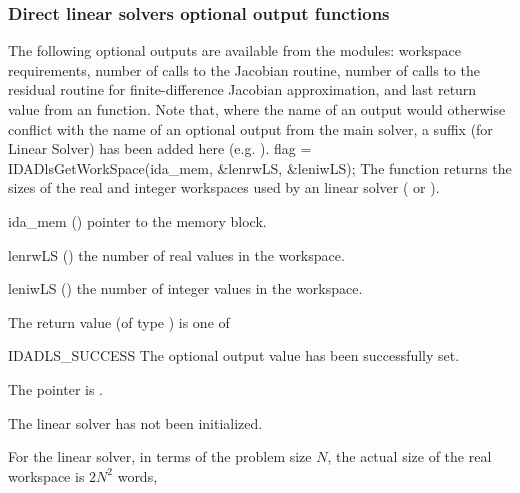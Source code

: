 {\subsubsection{Direct linear solvers optional output functions}\label{sss:optout_dls}
The following optional outputs are available from the {\idadls} modules:
workspace requirements, number of calls to the Jacobian routine, number of 
calls to the residual routine for finite-difference Jacobian approximation,
and last return value from an {\idadls} function.
Note that, where the name of an output would otherwise conflict with
the name of an optional output from the main solver, a suffix 
(for Linear Solver) has been added here (e.g.  ).
{
  flag = IDADlsGetWorkSpace(ida\_mem, \&lenrwLS, \&leniwLS);
}
{
  The function  returns the sizes of the real and
  integer workspaces used by an {\idadls} linear solver ({\idadense} or
  {\idaband}). 
}
{
  \begin{args}
  \item[ida\_mem] ()
    pointer to the {\ida} memory block.
  \item[lenrwLS] ()
    the number of real values in the {\idadls} workspace.
  \item[leniwLS] ()
    the number of integer values in the {\idadls} workspace.
  \end{args}
}
{
  The return value  (of type ) is one of
  \begin{args}
  \item[IDADLS\_SUCCESS] 
    The optional output value has been successfully set.
  \item[\Id{IDADLS\_MEM\_NULL}]
    The  pointer is .
  \item[\Id{IDADLS\_LMEM\_NULL}]
    The {\idadls} linear solver has not been initialized.
  \end{args}
}
{
  For the {\idadense} linear solver, in terms of the problem size $N$,
  the actual size of the real workspace is $2N^2$  words,
}}
